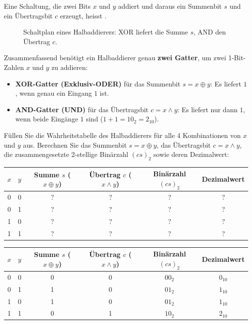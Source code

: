 Eine Schaltung, die zwei Bits $x$ und $y$ addiert und daraus ein Summenbit $s$ und ein Übertragsbit $c$ erzeugt, heisst .

\begin{figure}[H]
    \centering
    
    \caption{Schaltplan eines Halbaddierers: XOR liefert die Summe $s$, AND den Übertrag $c$.}
    \label{fig:halbaddierer}
\end{figure}

Zusammenfassend benötigt ein Halbaddierer genau \textbf{zwei Gatter}, um zwei 1-Bit-Zahlen $x$ und $y$ zu addieren:
\begin{itemize}
    \item \textbf{XOR-Gatter (Exklusiv-ODER)} für das Summenbit $s = x \oplus y$: Es liefert $1$, wenn genau ein Eingang $1$ ist.
    \item \textbf{AND-Gatter (UND)} für das Übertragsbit $c = x \land y$: Es liefert nur dann $1$, wenn beide Eingänge $1$ sind ($1+1 = 10_2 = 2_{10}$).
\end{itemize}

\begin{myexercise}
    Füllen Sie die Wahrheitstabelle des Halbaddierers für alle 4 Kombinationen von $x$ und $y$ aus. Berechnen Sie das Summenbit $s = x \oplus y$, das Übertragsbit $c = x \land y$, die zusammengesetzte 2-stellige Binärzahl $(c s)_2$ sowie deren Dezimalwert:
    \begin{center}
        \begin{tabular}{cccccc}
            $x$ & $y$ & Summe $s$ ($x \oplus y$) & Übertrag $c$ ($x \land y$) & Binärzahl $(c s)_2$ & Dezimalwert \\ \midrule\midrule
            0 & 0 & ? & ? & ? & ? \\ \midrule
            0 & 1 & ? & ? & ? & ? \\ \midrule
            1 & 0 & ? & ? & ? & ? \\ \midrule
            1 & 1 & ? & ? & ? & ? \\
        \end{tabular}
    \end{center}

    \begin{myanswer}
        \begin{center}
        \begin{tabular}{cccccc}
            $x$ & $y$ & Summe $s$ ($x \oplus y$) & Übertrag $c$ ($x \land y$) & Binärzahl $(c s)_2$ & Dezimalwert \\ \midrule\midrule
            0 & 0 & 0 & 0 & $00_2$ & $0_{10}$ \\ \midrule
            0 & 1 & 1 & 0 & $01_2$ & $1_{10}$ \\ \midrule
            1 & 0 & 1 & 0 & $01_2$ & $1_{10}$ \\ \midrule
            1 & 1 & 0 & 1 & $10_2$ & $2_{10}$ \\
        \end{tabular}
        \end{center}
    \end{myanswer}
\end{myexercise}

